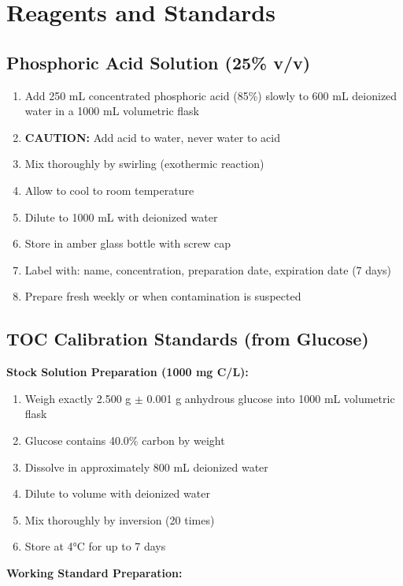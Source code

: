 \documentclass[11pt,a4paper]{article}\usepackage[]{graphicx}\usepackage[]{xcolor}
\begin{document}
\section{Reagents and Standards}

\subsection{Phosphoric Acid Solution (25\% v/v)}
\begin{enumerate}[noitemsep]
    \item Add 250 mL concentrated phosphoric acid (85\%) slowly to 600 mL deionized water in a 1000 mL volumetric flask
    \item \textbf{CAUTION:} Add acid to water, never water to acid
    \item Mix thoroughly by swirling (exothermic reaction)
    \item Allow to cool to room temperature
    \item Dilute to 1000 mL with deionized water
    \item Store in amber glass bottle with screw cap
    \item Label with: name, concentration, preparation date, expiration date (7 days)
    \item Prepare fresh weekly or when contamination is suspected
\end{enumerate}

\subsection{TOC Calibration Standards (from Glucose)}
\textbf{Stock Solution Preparation (1000 mg C/L):}
\begin{enumerate}[noitemsep]
    \item Weigh exactly 2.500 g $\pm$ 0.001 g anhydrous glucose into 1000 mL volumetric flask
    \item Glucose contains 40.0\% carbon by weight
    \item Dissolve in approximately 800 mL deionized water
    \item Dilute to volume with deionized water
    \item Mix thoroughly by inversion (20 times)
    \item Store at 4°C for up to 7 days
\end{enumerate}

\textbf{Working Standard Preparation:}
\end{document}
